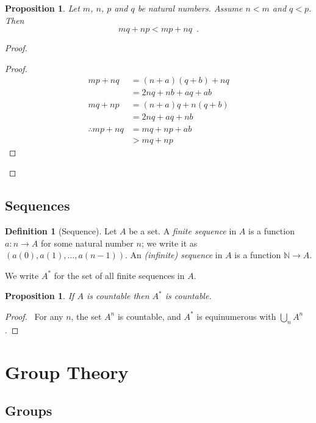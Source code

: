 \documentclass{book}
\let\qed\relax
\newtheorem{prop}[ax]{Proposition}
\theoremstyle{definition}
\newtheorem{df}[ax]{Definition}
\begin{document}
\begin{prop}
\label{prop:intmultlemma}
Let $m$, $n$, $p$ and $q$ be natural numbers. Assume $n < m$ and $q < p$. Then
\[ mq + np < mp + nq \enspace . \]
\end{prop}

\begin{proof}
\pf
{}
\begin{proof}
	\pf
	\begin{align*}
		mp + nq & = (n+a) (q + b) + nq \\
		& = 2nq + nb + aq + ab \\
		mq + np & = (n + a) q + n (q + b) \\
		& = 2nq + aq + nb \\
		\therefore mp + nq & = mq + np + ab \\
		& > mq + np
	\end{align*}
\end{proof}
\qed
\end{proof}

\section{Sequences}

\begin{df}[Sequence]
Let $A$ be a set. A \emph{finite sequence} in $A$ is a function $a : n \rightarrow A$ for some natural number $n$; we write it as $(a(0), a(1), \ldots, a(n-1))$. An \emph{(infinite) sequence} in $A$ is a function $\mathbb{N} \rightarrow A$.

We write $A^*$ for the set of all finite sequences in $A$.
\end{df}

\begin{prop}
If $A$ is countable then $A^*$ is countable.
\end{prop}

\begin{proof}
\pf\ For any $n$, the set $A^n$ is countable, and $A^*$ is equinumerous with $\bigcup_n A^n$. \qed
\end{proof}

\chapter{Group Theory}

\section{Groups}
\end{document}
